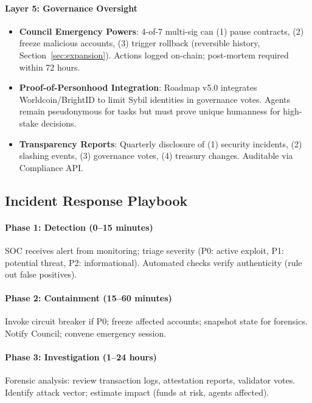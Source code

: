 \documentclass[11pt]{article}
\begin{document}
\paragraph{Layer 5: Governance Oversight}
\begin{itemize}[noitemsep]
  \item \textbf{Council Emergency Powers}: 4-of-7 multi-sig can (1) pause contracts, (2) freeze malicious accounts, (3) trigger rollback (reversible history, Section~\ref{sec:expansion}). Actions logged on-chain; post-mortem required within 72 hours.
  \item \textbf{Proof-of-Personhood Integration}: Roadmap v5.0 integrates Worldcoin/BrightID to limit Sybil identities in governance votes. Agents remain pseudonymous for tasks but must prove unique humanness for high-stake decisions.
  \item \textbf{Transparency Reports}: Quarterly disclosure of (1) security incidents, (2) slashing events, (3) governance votes, (4) treasury changes. Auditable via Compliance API.
\end{itemize}

\subsection{Incident Response Playbook}

\paragraph{Phase 1: Detection (0--15 minutes)}
SOC receives alert from monitoring; triage severity (P0: active exploit, P1: potential threat, P2: informational). Automated checks verify authenticity (rule out false positives).

\paragraph{Phase 2: Containment (15--60 minutes)}
Invoke circuit breaker if P0; freeze affected accounts; snapshot state for forensics. Notify Council; convene emergency session.

\paragraph{Phase 3: Investigation (1--24 hours)}
Forensic analysis: review transaction logs, attestation reports, validator votes. Identify attack vector; estimate impact (funds at risk, agents affected).
\end{document}
